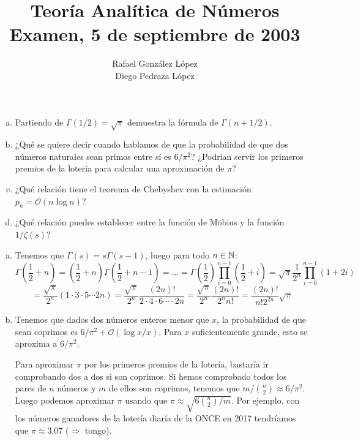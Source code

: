\documentclass[twoside]{article}
\providecommand{\bo}[1]{\mathcal{O}\left(#1\right)}
\begin{document}
\title{Teoría Analítica de Números\\Examen, 5 de septiembre de 2003}
\author{Rafael González López\\Diego Pedraza López}
\maketitle

\begin{ejercicio}{1}
\begin{enumerate}[(a)]
	\item Partiendo de $Γ(1/2)=\sqrt{π}$ demuestra la fórmula de $Γ(n+1/2)$.
	\item ¿Qué se quiere decir cuando hablamos de que la probabilidad de que dos números naturales sean primos entre sí es $6/π^2$? ¿Podrían servir los primeros premios de la loteria para calcular una aproximación de $π$?
	\item ¿Qué relación tiene el teorema de Chebyshev con la estimación $p_n = \mathcal{O}(n \log n)$?
	\item ¿Qué relación puedes establecer entre la función de Möbius y la función $1/ζ(s)$?
\end{enumerate}
\end{ejercicio}
\begin{solucion}
\begin{enumerate}[(a)]
	\item Tenemos que $Γ(s)=sΓ(s-1)$, luego para todo $n \in \mathbb{N}$:
	\[ Γ\left(\frac{1}{2}+n\right) = \left(\frac{1}{2}+n\right) Γ\left(\frac{1}{2}+n-1\right) = \dots = Γ\left(\frac{1}{2}\right)\prod_{i=0}^{n-1}\left(\frac{1}{2}+i\right) = \sqrt{π}\frac{1}{2^n}\prod_{i=0}^{n-1}\left(1+2i\right)\]
	\[ = \frac{\sqrt{π}}{2^n}(1 \cdot 3 \cdot 5 \cdots 2n) = \frac{\sqrt{π}}{2^n}\frac{(2n)!}{2 \cdot 4 \cdot 6 \cdots \cdot 2n} = \frac{\sqrt{π}}{2^n}\frac{(2n)!}{2^n n!}  = \frac{(2n)!}{n!2^{2n}}\sqrt{π} \]
	
	\item Tenemos que dados dos números enteros menor que $x$, la probabilidad de que sean coprimos es $6/π^2+\bo{\log x/x}$.
	Para $x$ suficientemente grande, esto se aproxima a $6/π^2$.
	
Para aproximar $π$ por los primeros premios de la lotería, bastaría ir comprobando dos a dos si son coprimos.
Si hemos comprobado todos los pares de $n$ números y $m$ de ellos son coprimos, tenemos que $m/\binom{n}{2} \approx 6/π^2$.
Luego podemos aproximar $π$ usando que $π \approx \sqrt{6\binom{n}{2}/m}$.
Por ejemplo, con los números ganadores de la lotería diaría de la ONCE en 2017 tendríamos que $π \approx 3.07$ ($\Rightarrow$ tongo).
\end{enumerate}
\end{solucion}
\end{document}
